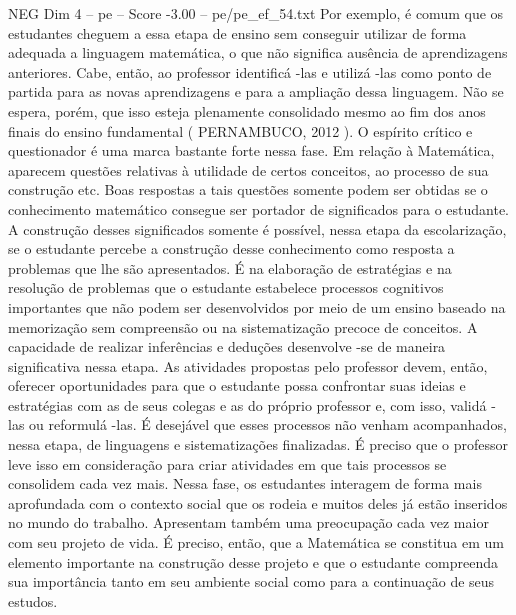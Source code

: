 \begin{textsample}{NEG Dim 4 – pe – Score -3.00 – pe/pe\_ef\_54.txt}
Por exemplo, é comum que os estudantes cheguem a essa etapa de ensino sem conseguir utilizar de forma adequada a linguagem matemática, o que não significa ausência de aprendizagens anteriores.
Cabe, então, ao professor identificá -las e utilizá -las como ponto de partida para as novas aprendizagens e para a ampliação dessa linguagem.
Não se espera, porém, que isso esteja plenamente consolidado mesmo ao fim dos anos finais do ensino fundamental ( PERNAMBUCO, 2012 ).
O espírito crítico e questionador é uma marca bastante forte nessa fase.
Em relação à Matemática, aparecem questões relativas à utilidade de certos conceitos, ao processo de sua construção etc.
Boas respostas a tais questões somente podem ser obtidas se o conhecimento matemático consegue ser portador de significados para o estudante.
A construção desses significados somente é possível, nessa etapa da escolarização, se o estudante percebe a construção desse conhecimento como resposta a problemas que lhe são apresentados.
É na elaboração de estratégias e na resolução de problemas que o estudante estabelece processos cognitivos importantes que não podem ser desenvolvidos por meio de um ensino baseado na memorização sem compreensão ou na sistematização precoce de conceitos.
A capacidade de realizar inferências e deduções desenvolve -se de maneira significativa nessa etapa.
As atividades propostas pelo professor devem, então, oferecer oportunidades para que o estudante possa confrontar suas ideias e estratégias com as de seus colegas e as do próprio professor e, com isso, validá -las ou reformulá -las.
É desejável que esses processos não venham acompanhados, nessa etapa, de linguagens e sistematizações finalizadas.
É preciso que o professor leve isso em consideração para criar atividades em que tais processos se consolidem cada vez mais.
Nessa fase, os estudantes interagem de forma mais aprofundada com o contexto social que os rodeia e muitos deles já estão inseridos no mundo do trabalho.
Apresentam também uma preocupação cada vez maior com seu projeto de vida.
É preciso, então, que a Matemática se constitua em um elemento importante na construção desse projeto e que o estudante compreenda sua importância tanto em seu ambiente social como para a continuação de seus estudos.

\end{textsample}
